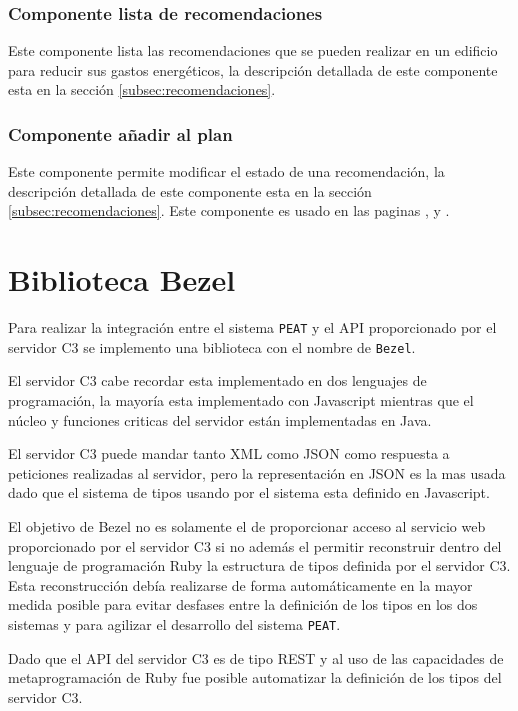 \subsubsection{Componente lista de recomendaciones}

Este componente lista las recomendaciones que se pueden realizar en un edificio para
reducir sus gastos energéticos, la descripción detallada de este componente esta en
la sección \ref{subsec:recomendaciones}.

\subsubsection{Componente añadir al plan}

Este componente permite modificar el estado de una recomendación,
la descripción detallada de este componente esta en la sección
\ref{subsec:recomendaciones}. Este componente es usado en las paginas
,  y
.

\section{Biblioteca Bezel}

Para realizar la integración entre el sistema \texttt{PEAT} y el API proporcionado
por el servidor C3 se implemento una biblioteca con el nombre de \texttt{Bezel}.

El servidor C3 cabe recordar esta implementado en dos lenguajes de programación, la
mayoría esta implementado con Javascript mientras que el núcleo y funciones criticas
del servidor están implementadas en Java.

El servidor C3 puede mandar tanto XML como JSON como respuesta a peticiones
realizadas al servidor, pero la representación en JSON es la mas usada dado que el
sistema de tipos usando por el sistema esta definido en Javascript.

El objetivo de Bezel no es solamente el de proporcionar acceso al servicio web
proporcionado por el servidor C3 si no además el permitir reconstruir dentro
del lenguaje de programación Ruby la estructura de tipos definida por el servidor C3.
Esta reconstrucción debía realizarse de forma automáticamente en la mayor medida
posible para evitar desfases entre la definición de los tipos en los dos sistemas y
para agilizar el desarrollo del sistema \texttt{PEAT}.

Dado que el API del servidor C3 es de tipo REST y al uso de las capacidades de
metaprogramación de Ruby fue posible automatizar la definición de los tipos del
servidor C3.

